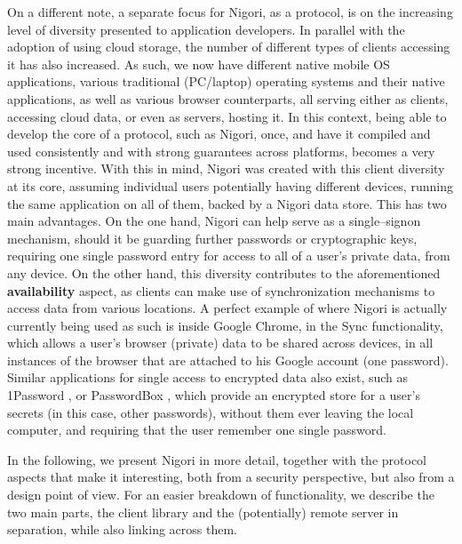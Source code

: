 On a different note, a separate focus for Nigori, as a protocol, is on the increasing level of diversity presented to application developers.
In parallel with the adoption of using cloud storage, the number of different types of clients accessing it has also increased.
As such, we now have different native mobile OS applications, various traditional (PC/laptop) operating systems and their native applications, as well as various browser counterparts, all serving either as clients, accessing cloud data, or even as servers, hosting it.
In this context, being able to develop the core of a protocol, such as Nigori, once, and have it compiled and used consistently and with strong guarantees across platforms, becomes a very strong incentive.
With this in mind, Nigori was created with this client diversity at its core, assuming individual users potentially having different devices, running the same application on all of them, backed by a Nigori data store.
This has two main advantages.
On the one hand, Nigori can help serve as a single--signon mechanism, should it be guarding further passwords or cryptographic keys, requiring one single password entry for access to all of a user's private data, from any device.
On the other hand, this diversity contributes to the aforementioned \textbf{availability} aspect, as clients can make use of synchronization mechanisms to access data from various locations.
A perfect example of where Nigori is actually currently being used as such is inside Google Chrome, in the Sync functionality, which allows a user's browser (private) data to be shared across devices, in all instances of the browser that are attached to his Google account (one password).
Similar applications for single access to encrypted data also exist, such as 1Password \cite{OnePassword}, or PasswordBox \cite{PasswordBox}, which provide an encrypted store for a user's secrets (in this case, other passwords), without them ever leaving the local computer, and requiring that the user remember one single password.

In the following, we present Nigori in more detail, together with the protocol aspects that make it interesting, both from a security perspective, but also from a design point of view.
For an easier breakdown of functionality, we describe the two main parts, the client library and the (potentially) remote server in separation, while also linking across them.

